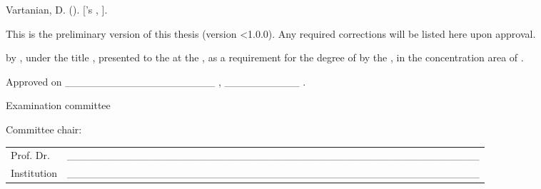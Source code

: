 \begin{errata}[\errataname]
\noindent Vartanian, D. ({\imprimirdata}). \textit{\imprimirtitulo} [{\imprimirtipodetituloacademico}'s {\imprimirtipotrabalho}, {\imprimiruniversidade}].
\smallskip

This is the preliminary version of this thesis (version \textless1.0.0).
Any required corrections will be listed here upon approval.

\end{errata}


\begin{folhadeaprovacao}[\folhadeaprovacaoname]
{\imprimirtipotrabalho} by {\imprimirautor}, under the title \textbf{\imprimirtitulo}, presented to the {\imprimirescola} at the {\imprimiruniversidade}, as a requirement for the degree of {\imprimirtituloacademico} by the {\imprimirprograma}, in the concentration area of {\imprimirareadeconcentracao}.

\vspace{\hugeskipamount}
Approved on \_\_\_\_\_\_\_\_\_\_\_\_\_\_\_\_\_\_\_\_ , \_\_\_\_\_\_\_\_\_\_ .

\vspace{\hugeskipamount}
\begin{center}
  Examination committee
\end{center}

\vspace{\smallskipamount}
Committee chair:

\vspace{\tinyskipamount}
\begingroup


\setlength{\arrayrulewidth}{0pt}
\setlength{\tabcolsep}{0cm}
\begin{tabular}{m{2cm} P{14cm}}
  Prof. Dr. & \_\_\_\_\_\_\_\_\_\_\_\_\_\_\_\_\_\_\_\_\_\_\_\_\_\_\_\_\_\_\_\_\_\_\_\_\_\_\_\_\_\_\_\_\_\_\_\_\_\_\_\_\_\_\_ \\
  Institution & \_\_\_\_\_\_\_\_\_\_\_\_\_\_\_\_\_\_\_\_\_\_\_\_\_\_\_\_\_\_\_\_\_\_\_\_\_\_\_\_\_\_\_\_\_\_\_\_\_\_\_\_\_\_\_ \\
\end{tabular}


\end{folhadeaprovacao}
